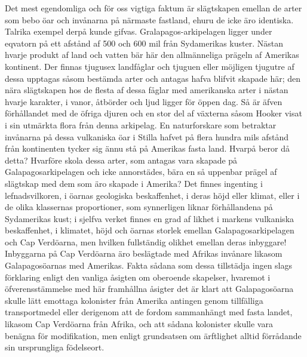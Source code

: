 Det mest egendomliga och för oss vigtiga faktum är slägtskapen emellan de arter som bebo öar och invånarna på närmaste fastland, ehuru de icke äro identiska. Talrika exempel derpå kunde gifvas. Gralapagos-arkipelagen ligger under eqvatorn på ett afstånd af 500 och 600 mil från Sydamerikas kuster. Nästan hvarje produkt af land och vatten bär här den allmänneliga prägeln af Amerikas kontinent. Der finnas tjugusex landfåglar och tjuguen eller möjligen tjugutre af dessa upptagas såsom bestämda arter och antagas hafva blifvit skapade här; den nära slägtskapen hos de flesta af dessa fåglar med amerikanska arter i nästan hvarje karakter, i vanor, åtbörder och ljud ligger för öppen dag. Så är äfven förhållandet med de öfriga djuren och en stor del af växterna såsom Hooker visat i sin utmärkta flora från denna arkipelag. En naturforskare som betraktar invånarna på dessa vulkaniska öar i Stilla hafvet på flera hundra mils afstånd från kontinenten tycker sig ännu stå på Amerikas fasta land. Hvarpå beror då detta? Hvarföre skola dessa arter, som antagas vara skapade på Galapagosarkipelagen och icke annorstädes, bära en så uppenbar prägel af slägtskap med dem som äro skapade i Amerika? Det finnes ingenting i lefnadsvilkoren, i öarnas geologiska beskaffenhet, i deras höjd eller klimat, eller i de olika klassernas proportioner, som synnerligen liknar förhållandena på Sydamerikas kust; i sjelfva verket finnes en grad af likhet i markens vulkaniska beskaffenhet, i klimatet, höjd och öarnas storlek emellan Galapagosarkipelagen och Cap Verdöarna, men hvilken fullständig olikhet emellan deras inbyggare! Inbyggarna på Cap Verdöarna äro beslägtade med Afrikas invånare likasom Galapagosöarnas med Amerikas. Fakta sådana som dessa tillstädja ingen slags förklaring enligt den vanliga åsigten om oberoende skapelser, hvaremot i öfverensstämmelse med här framhållna åsigter det är klart att Galapagosöarna skulle lätt emottaga kolonister från Amerika antingen genom tillfälliga transportmedel eller derigenom att de fordom sammanhängt med fasta landet, likasom Cap Verdöarna från Afrika, och att sådana kolonister skulle vara benägna för modifikation, men enligt grundsatsen om ärftlighet alltid förrådande sin ursprungliga födelseort.

